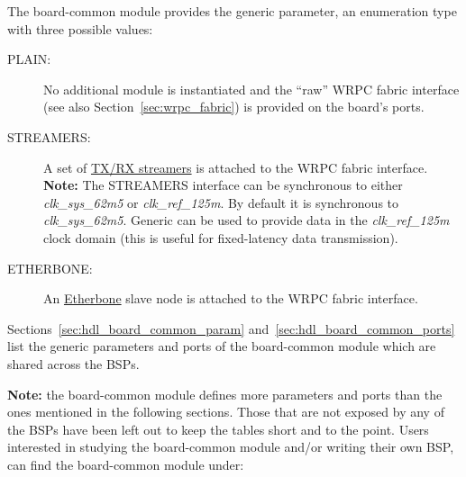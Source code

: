 The board-common module provides the  generic parameter, an enumeration
type with three possible values:

\begin{description}
\item[PLAIN:] No additional module is instantiated and the ``raw'' WRPC fabric interface (see also
  Section~\ref{sec:wrpc_fabric}) is provided on the board's ports.
\item[STREAMERS:] A set of \href{http://www.ohwr.org/projects/wr-cores/wiki/WR_Streamers}{TX/RX
  streamers} is attached to the WRPC fabric interface.\\
  \textbf{Note:} The STREAMERS interface can be synchronous to either \textit{clk\_sys\_62m5}
  or \textit{clk\_ref\_125m}. By default it is synchronous to \textit{clk\_sys\_62m5}. Generic
  can be used to provide data in the \textit{clk\_ref\_125m} clock domain (this is useful for
  fixed-latency data transmission).
\item[ETHERBONE:] An \href{http://www.ohwr.org/projects/etherbone-core/wiki}{Etherbone} slave node
  is attached to the WRPC fabric interface.
\end{description}

Sections~\ref{sec:hdl_board_common_param} and~\ref{sec:hdl_board_common_ports} list the generic
parameters and ports of the board-common module which are shared across the BSPs.

\textbf{Note:} the board-common module defines more parameters and ports than the ones mentioned in
the following sections. Those that are not exposed by any of the BSPs have been left out to keep the
tables short and to the point. Users interested in studying the board-common module and/or writing
their own BSP, can find the board-common module under:
\\

\newpage
{}
\label{sec:hdl_board_common_param}

